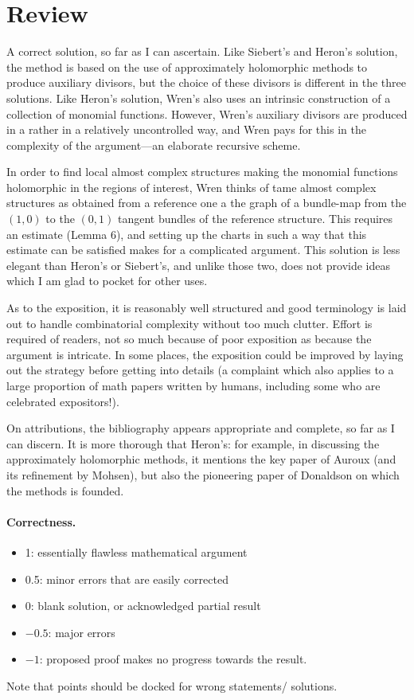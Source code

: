 \documentclass[11pt]{article}
\theoremstyle{remark}
\begin{document}
\maketitle
\section{Review}

A correct solution, so far as I can ascertain. Like Siebert's and Heron's solution, the method is based on the use of approximately holomorphic methods to produce auxiliary divisors, but the choice of these divisors is different in the three solutions. Like Heron's solution, Wren's also uses an intrinsic construction of a collection of monomial functions. However, Wren's auxiliary divisors are produced in a rather in a relatively uncontrolled way, and Wren pays for this in the complexity of the argument---an elaborate recursive scheme. 

In order to find local almost complex structures making the monomial functions holomorphic in the regions of interest, Wren thinks of tame almost complex structures as obtained from a reference one a the graph of a bundle-map from the $(1,0)$ to the $(0,1)$ tangent bundles of the reference structure. This requires an estimate (Lemma 6), and setting up the charts in such a way that this estimate can be satisfied makes for a complicated argument. This solution is less elegant than Heron's or Siebert's, and unlike those two, does not provide ideas which I am glad to pocket for other uses.

As to the exposition, it is reasonably well structured and good terminology is laid out to handle combinatorial complexity without too much clutter.  Effort is required of readers, not so much  because of poor exposition as because the argument is intricate. In some places, the exposition could be improved by laying out the strategy before getting into details (a complaint which also applies to a large proportion of math papers written by humans, including some who are celebrated expositors!).

On attributions, the bibliography appears appropriate and complete, so far as I can discern. It is more thorough that Heron's: for example, in discussing the approximately holomorphic methods, it mentions the key paper of Auroux (and its refinement by Mohsen), but also the pioneering paper of Donaldson on which the methods is founded.

\paragraph{Correctness.}
\begin{itemize}
	\item  1: essentially flawless mathematical argument
	\item  0.5: minor errors that are easily corrected
	\item  0: blank solution, or acknowledged partial result
	\item  $-0.5$: major errors
	\item  $-1$: proposed proof makes no progress towards the result.
\end{itemize}
Note that points should be docked for wrong statements/ solutions.
\end{document}
